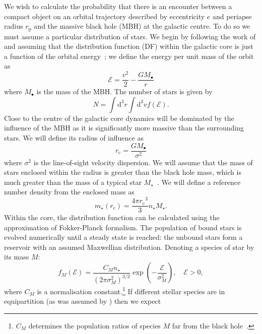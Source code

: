 \documentclass[useAMS,usedcolumn,usegraphicx,usenatbib]{mn2e}
\newcommand{\sub}[1]{\ensuremath{_\mathrm{#1}}}
\newcommand{\dd}{\ensuremath{\mathrm{d}}}
\begin{document}
We wish to calculate the probability that there is an encounter between a compact object on an orbital trajectory described by eccentricity $e$ and periapse radius $r\sub{p}$ and the massive black hole (MBH) at the galactic centre. To do so we must assume a particular distribution of stars. We begin by following the work of \citet{Bahcall1976, Bahcall1977} and assuming that the distribution function (DF) within the galactic core is just a function of the orbital energy~\citep{Shapiro1978}; we define the energy per unit mass of the orbit as
\begin{equation}
\mathcal{E} = \frac{v^2}{2} - \frac{GM_\bullet}{r}
\end{equation}
where $M_\bullet$ is the mass of the MBH. The number of stars is given by
\begin{equation}
N = \int \dd^3r \int \dd^3v f(\mathcal{E}).
\end{equation}
Close to the centre of the galactic core dynamics will be dominated by the influence of the MBH as it is significantly more massive than the surrounding stars. We will define its radius of influence as~\citep{Frank1976}
\begin{equation}
r\sub{c} = \frac{GM_\bullet}{\sigma^2}
\label{eq:r_c}
\end{equation}
where $\sigma^2$ is the line-of-sight velocity dispersion. We will assume that the mass of stars enclosed within the radius is greater than the black hole mass, which is much greater than the mass of a typical star $M_\star$~\citep{Bahcall1976}. We will define a reference number density from the enclosed mass as
\begin{equation}
m_\star(r\sub{c}) = \frac{4\pi r\sub{c}^3}{3}n_\star M_\star.
\end{equation}
Within the core, the distribution function can be calculated using the approximation of Fokker-Planck formalism. The population of bound stars is evolved numerically until a steady state is reached: the unbound stars form a reservoir with an assumed Maxwellian distribution. Denoting a species of star by its mass $M$:
\begin{equation}
f_M(\mathcal{E}) = \frac{C_M n_\star}{(2\pi\sigma_M^2)^{3/2}} \exp\left(-\frac{\mathcal{E}}{\sigma_M^2}\right),\quad\mathcal{E} > 0,
\label{eq:Unbound_DF}
\end{equation}
where $C_M$ is a normalisation constant.\footnote{$C_M$ determines the population ratios of species $M$ far from the black hole~\citep{Alexander2009}.} If different stellar species are in equipartition (as was assumed by \citealt{Bahcall1976, Bahcall1977}) then we expect
\end{document}
